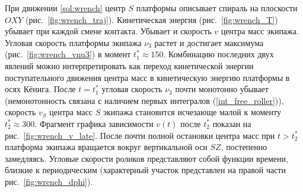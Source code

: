 При движении \ref{sol:wrench} центр $S$ платформы описывает спираль на плоскости $OXY$ (рис.~\ref{fig:wrench_traj}). Кинетическая энергия (рис.~\ref{fig:wrench_T}) убывает при каждой смене контакта. Убывает и скорость $v$ центра масс экипажа. Угловая скорость платформы экипажа $\nu_3$ растет и достигает максимума (рис.~\ref{fig:wrench_vnu3}) в момент $t^*_1 \approx 150$. Комбинацию последних двух явлений можно интерпретировать как переход кинетической энергии поступательного движения центра масс в кинетическую энергию платформы в осях Кёнига. После $t = t^*_1$ угловая скорость $\nu_3$ почти монотонно убывает (немонотонность связана с наличием первых интегралов (\ref{int_free_roller})), скорость $v_S$ центра масс $S$ экипажа становится исчезающе малой к моменту $t^*_2 \approx 300$. Фрагмент графика зависимости $v(t)$ после $t^*_2$ показан на рис.~\ref{fig:wrench_v_late}. После почти полной остановки центра масс при  $t > t^*_2$ платформа экипажа вращается вокруг вертикальной оси $SZ$, постепенно замедляясь. Угловые скорости роликов представляют собой функции времени, близкие к периодическим (характерный участок представлен на правой части рис.~\ref{fig:wrench_dphi}).

\newpage



